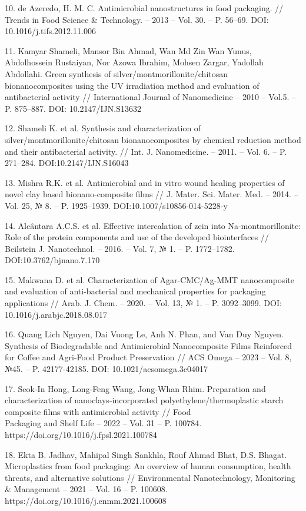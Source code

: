\begin{references}
10. de Azeredo, H. M. C. Antimicrobial nanostructures in food packaging.
// Trends in Food Science \& Technology. -- 2013 -- Vol. 30. -- P.
56--69. DOI: 10.1016/j.tifs.2012.11.006

11. Kamyar Shameli, Mansor Bin Ahmad, Wan Md Zin Wan Yunus, Abdolhossein
Rustaiyan, Nor Azowa Ibrahim, Mohsen Zargar, Yadollah Abdollahi. Green
synthesis of silver/montmorillonite/chitosan \\bionanocomposites using
the UV irradiation method and evaluation of antibacterial activity //
International Journal of Nanomedicine -- 2010 -- Vol.5. -- P.
875--887. DOI: 10.2147/IJN.S13632

12. Shameli K. et al. Synthesis and characterization of
silver/montmorillonite/chitosan bionanocomposites by chemical
reduction method and their antibacterial activity. // Int. J.
Nanomedicine. -- 2011. -- Vol. 6. -- P. 271--284.
DOI:10.2147/IJN.S16043

13. Mishra R.K. et al. Antimicrobial and in vitro wound healing properties
of novel clay based bionano-composite films // J. Mater. Sci. Mater.
Med. -- 2014. -- Vol. 25, № 8. -- P. 1925--1939.
DOI:10.1007/s10856-014-5228-y

14. Alcântara A.C.S. et al. Effective intercalation of zein into
Na-montmorillonite: Role of the protein components and use of the
developed biointerfaces // Beilstein J. Nanotechnol. -- 2016. -- Vol.
7, № 1. -- P. 1772--1782. DOI:10.3762/bjnano.7.170

15. Makwana D. et al. Characterization of Agar-CMC/Ag-MMT nanocomposite
and evaluation of anti-bacterial and mechanical properties for
packaging applications // Arab. J. Chem. -- 2020. -- Vol. 13, № 1. --
P. 3092--3099. DOI: 10.1016/j.arabjc.2018.08.017

16. Quang Lich Nguyen, Dai Vuong Le, Anh N. Phan, and Van Duy Nguyen.
Synthesis of Biodegradable and Antimicrobial Nanocomposite Films
Reinforced for Coffee and Agri-Food Product Preservation // ACS Omega
-- 2023 -- Vol. 8, №45. -- P. 42177-42185. DOI:
10.1021/acsomega.3c04017

17. Seok-In Hong, Long-Feng Wang, Jong-Whan Rhim. Preparation and
characterization of nanoclays-incorporated polyethylene/thermoplastic
starch composite films with antimicrobial activity // Food \\Packaging
and Shelf Life -- 2022 -- Vol. 31 -- P. 100784.
https://doi.org/10.1016/j.fpsl.2021.100784

18. Ekta B. Jadhav, Mahipal Singh Sankhla, Rouf Ahmad Bhat, D.S. Bhagat.
Microplastics from food packaging: An overview of human consumption,
health threats, and alternative solutions // Environmental
Nanotechnology, Monitoring \& Management -- 2021 -- Vol. 16 -- P.
100608. \\https://doi.org/10.1016/j.enmm.2021.100608


\end{references}
